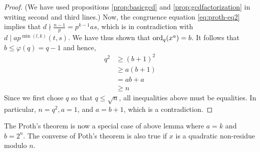 \documentclass{subfiles}
\begin{document}
\begin{proof}
			(We have used propositions \eqref{prop:basicgcd} and \eqref{prop:gcdfactorization} in writing second and third lines.) Now, the congruence equation \eqref{eq:proth-eq2} implies that $d \nmid \frac{n-1}{p}=p^{k-1}as$, which is in contradiction with $d\mid a p^{\min(l,k)} (t,s)$. We have thus shown that $\operatorname{ord}_q(x^a)=b$. It follows that $b \leq \varphi(q) = q-1$ and hence,
				\begin{align*}
					q^2 &\geq (b+1)^2\\
						&\geq a(b+1)\\
						&=ab+a\\
						&\geq n
				\end{align*}
			Since we first chose $q$ so that $q \leq \sqrt n$, all inequalities above must be equalities. In particular, $n=q^2, a=1$, and $a=b+1$, which is a contradiction.
		\end{proof}


		\begin{remark}
			The Proth's theorem is now a special case of above lemma where $a=k$ and $b=2^n$. The converse of Poth's theorem is also true if $x$ is a quadratic non-residue modulo $n$.
		\end{remark}
\end{document}
